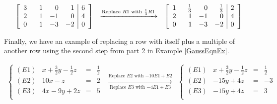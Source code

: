 \[\begin{array}{ccc}

\left[ \begin{array}{rrrr|r} 
3 & \hphantom{-} 1 & 0 & 1 & 6  \\
2 & 1 & -1 & 0 & 4 \\ 
0 & 1 & -3 & -2 & 0 \\ 

\end{array} \right]

&
\xrightarrow{\text{Replace $R1$ with $\frac{1}{3}R1$}}

&

\left[ \begin{array}{rrrr|r} 
1 & \frac{1}{3} & 0 & \frac{1}{3} & 2  \\
2 & \hphantom{-}1 & -1 & 0 & 4 \\ 
0 & 1 & -3 & -2 & 0 \\ 

\end{array} \right]
\end{array}\]

Finally, we have an example of replacing a row with itself plus a multiple of another row using the second step from part 2 in Example \ref{GaussEqnEx}.

\[ \begin{array}{ccc}

\left\{ 

\begin{array}{lrcr}

(E1) & x+\frac{3}{2}y-\frac{1}{2}z & = & \frac{1}{2} \\ 
(E2) & 10x-z & = & 2 \\
(E3) &  4x-9y+2z & = & 5 \\

\end{array} 

\right.
&
\xrightarrow[\text{Replace $E3$ with $-4E1 + E3$}]{\text{Replace $E2$ with $-10E1 + E2$}}

&

\left\{ 

\begin{array}{lrcr}

(E1) & x+\frac{3}{2}y-\frac{1}{2}z & = & \frac{1}{2} \\ 
(E2) & -15y+4z & = & -3 \\
(E3) & -15y+4z & = & 3 \\

\end{array} 

\right.
 \end{array} \]
 
